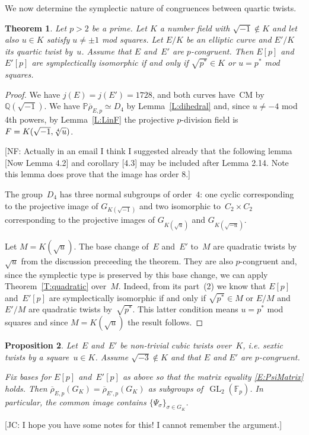 \documentclass[12pt, reqno]{amsart}
\newcommand{\F}{\mathbb{F}}
\newcommand{\PP}{\mathbb{P}}
\newcommand{\Q}{\mathbb{Q}}
\newcommand{\rhobar}{{\overline{\rho}}}
\newcommand{\GL}{\operatorname{GL}}
\numberwithin{equation}{section}
\newtheorem{theorem}{Theorem}[section]
\newtheorem{proposition}[theorem]{Proposition}
\theoremstyle{definition}
\theoremstyle{remark}
\newcommand{\nf}[1]{{\color{blue} \textsf{[NF: #1]}}}
\newcommand{\jc}[1]{{\color{darkgreen} \textsf{[JC: #1]}}}
\begin{document}
We now determine the symplectic nature of congruences between quartic
twists.

\begin{theorem}\label{T:quarticM} 
Let $p > 2$ be a prime. Let $K$ a number field with $\sqrt{-1} \not\in K$ and let also $u \in K$ satisfy $u \neq \pm 1$ mod squares. 
Let $E/K$ be an elliptic curve and $E'/K$
its quartic twist by~$u$.
Assume that $E$ and~$E'$ are $p$-congruent.
Then $E[p]$ and~$E'[p]$ are symplectically isomorphic if and only if
$\sqrt{p^*} \in K$ or $u = p^*$ mod squares.
\end{theorem}

\begin{proof} 
We have $j(E)=j(E')=1728$, and both curves have~CM by
$\Q(\sqrt{-1})$. We have $\PP \rhobar_{E,p} \simeq D_4$ by
Lemma~\ref{L:dihedral} and, since $u \neq -4$ mod 4th powers, by
Lemma~\ref{L:LinF} the projective $p$-division field is $F =
K(\sqrt{-1},\root 4 \of u)$.

\nf{Actually in an email I think I suggested already that the
  following lemma [Now Lemma 4.2] and corollary [4.3] may be included
  after Lemma 2.14. Note this lemma does prove that the image has
  order 8.}
  
The group~$D_4$ has three normal subgroups of order~$4$: one cyclic corresponding to the projective image of $G_{K(\sqrt{-1})}$ and two isomorphic to~$C_2 \times C_2$ corresponding to the projective images of
$G_{K(\sqrt{u})}$ and $G_{K(\sqrt{-u})}$.

Let $M = K(\sqrt{u})$. 
The base change of~$E$ and~$E'$  
to~$M$ are quadratic twists by~$\sqrt{u}$ from the discussion preceeding the theorem. They are also $p$-congruent and,  since the 
symplectic type is preserved by this base change, we can apply Theorem~\ref{T:quadratic} over~$M$.  
Indeed, from its part~(2) we know that
$E[p]$ and~$E'[p]$ are symplectically isomorphic if and only if $\sqrt{p^*} \in M$ 
or $E/M$ and $E'/M$ are quadratic twists by~$\sqrt{p^*}$. 
This latter condition means $u = p^*$ mod squares and since $M = K(\sqrt{u})$ the result follows.
\end{proof}


\begin{proposition} \label{P:PsiInImage}
Let~$E$ and~$E'$ be non-trivial cubic twists over~$K$, i.e. sextic twists by a square~$u \in K$. Assume $\sqrt{-3} \not\in K$ and that $E$ and $E'$ are $p$-congruent.

Fix bases for $E[p]$ and~$E'[p]$ as above so that the matrix equality \eqref{E:PsiMatrix} holds. Then 
$\rhobar_{E,p}(G_K) = \rhobar_{E',p}(G_K)$ 
as subgroups of~$\GL_2(\F_p)$. In particular, the common image contains $\{ \Psi_\sigma \}_{\sigma \in G_K}$.
\end{proposition}
\jc{I hope you have some notes for this!  I cannot remember the argument.}
\end{document}
